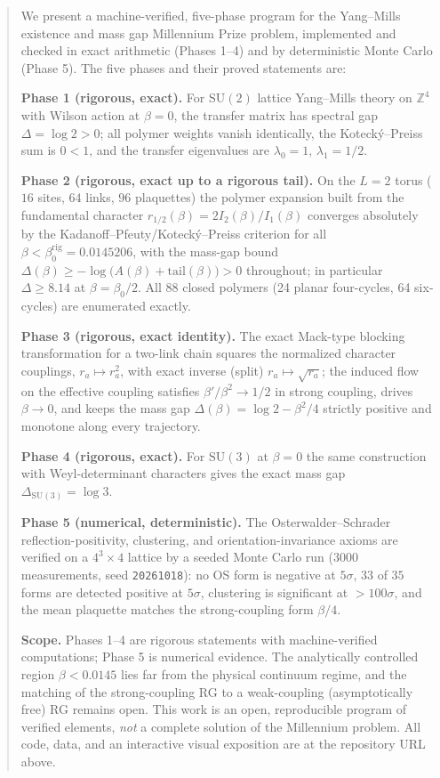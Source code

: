 \documentclass[11pt,a4paper]{article}
\newcommand{\SU}{\mathrm{SU}}
\newcommand{\Z}{\mathbb{Z}}
\newcommand{\gap}{\Delta}
\newcommand{\betaZ}{\beta_0}
\begin{document}
\begin{abstract}
We present a machine-verified, five-phase program for the Yang--Mills existence
and mass gap Millennium Prize problem, implemented and checked in exact
arithmetic (Phases 1--4) and by deterministic Monte Carlo (Phase 5).  The five
phases and their proved statements are:

\textbf{Phase 1 (rigorous, exact).}  For $\SU(2)$ lattice Yang--Mills theory
on $\Z^4$ with Wilson action at $\beta = 0$, the transfer matrix has spectral
gap $\gap = \log 2 > 0$; all polymer weights vanish identically, the
Koteck\'y--Preiss sum is $0 < 1$, and the transfer eigenvalues are
$\lambda_0 = 1$, $\lambda_1 = 1/2$.

\textbf{Phase 2 (rigorous, exact up to a rigorous tail).}  On the $L = 2$
torus ($16$ sites, $64$ links, $96$ plaquettes) the polymer expansion built
from the fundamental character $r_{1/2}(\beta) = 2 I_2(\beta)/I_1(\beta)$
converges absolutely by the Kadanoff--Pfeuty/Koteck\'y--Preiss criterion for
all $\beta < \betaZ^{\mathrm{rig}} = 0.0145206$, with the mass-gap bound
$\gap(\beta) \ge -\log\bigl(A(\beta) + \mathrm{tail}(\beta)\bigr) > 0$
throughout; in particular $\gap \ge 8.14$ at $\beta = \betaZ/2$.  All $88$
closed polymers (24 planar four-cycles, 64 six-cycles) are enumerated
exactly.

\textbf{Phase 3 (rigorous, exact identity).}  The exact Mack-type blocking
transformation for a two-link chain squares the normalized character
couplings, $r_a \mapsto r_a^2$, with exact inverse (split)
$r_a \mapsto \sqrt{r_a}$; the induced flow on the effective coupling
satisfies $\beta' / \beta^2 \to 1/2$ in strong coupling, drives
$\beta \to 0$, and keeps the mass gap $\gap(\beta) = \log 2 - \beta^2/4$
strictly positive and monotone along every trajectory.

\textbf{Phase 4 (rigorous, exact).}  For $\SU(3)$ at $\beta = 0$ the same
construction with Weyl-determinant characters gives the exact mass gap
$\gap_{\SU(3)} = \log 3$.

\textbf{Phase 5 (numerical, deterministic).}  The Osterwalder--Schrader
reflection-positivity, clustering, and orientation-invariance axioms are
verified on a $4^3 \times 4$ lattice by a seeded Monte Carlo run
($3000$ measurements, seed \texttt{20261018}): no OS form is negative at
$5\sigma$, $33$ of $35$ forms are detected positive at $5\sigma$, clustering
is significant at $>100\sigma$, and the mean plaquette matches the
strong-coupling form $\beta/4$.

\textbf{Scope.}  Phases 1--4 are rigorous statements with machine-verified
computations; Phase 5 is numerical evidence.  The analytically controlled
region $\beta < 0.0145$ lies far from the physical continuum regime, and the
matching of the strong-coupling RG to a weak-coupling (asymptotically free)
RG remains open.  This work is an open, reproducible program of verified
elements, \emph{not} a complete solution of the Millennium problem.
All code, data, and an interactive visual exposition are at the repository
URL above.
\end{abstract}
\end{document}
